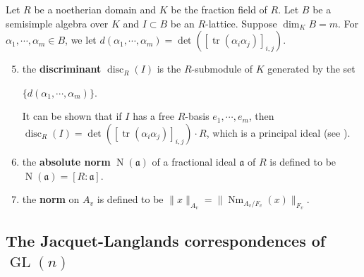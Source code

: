 \documentclass[11pt]{article}
\theoremstyle{plain}
\theoremstyle{remark}
\theoremstyle{definition}
\DeclareMathOperator{\tr}{tr}
\DeclareMathOperator{\Nm}{Nm}
\DeclareMathOperator{\GL}{GL}
\DeclareMathOperator{\disc}{disc}
\DeclareMathOperator{\N}{N}
\begin{document}

Let $R$ be a noetherian domain and $K$ be the fraction field of $R$.
Let $B$ be a semisimple algebra over $K$ and $I
\subset B$ be an $R$-lattice. 
Suppose $\dim_K B=m$. 
For $\alpha_1,\cdots,\alpha_m\in B$, we let $d(\alpha_1,\cdots,\alpha_m)=\det([\tr(\alpha_i\alpha_j)]_{i,j})$.  

\begin{enumerate}
\setcounter{enumi}{4}
\item the \textbf{discriminant} $\disc_{R}(I)$ is the $R$-submodule of $K$ generated by the set
\begin{center}
    $\{d(\alpha_1,\cdots,\alpha_m)\}$. 
\end{center}
It can be shown that if $I$ has a free $R$-basis $e_1,\cdots,e_m$, then $\disc_R(I)=\det([\tr(\alpha_i\alpha_j)]_{i,j})\cdot R$, which is a principal ideal (see \cite[\S 10]{Rei03}). 

\item the \textbf{absolute norm} $\N(\mathfrak{a})$ of a fractional ideal $\mathfrak{a}$ of $R$ is defined to be $\N(\mathfrak{a})=[R\colon \mathfrak{a}]$.




\item the \textbf{norm} on $A_v$ is defined to be $\|x\|_{A_v}=\|\Nm_{A_v/F_v}(x)\|_{F_v}$. 
\end{enumerate}



\subsection{The Jacquet-Langlands correspondences of $\GL(n)$}
\end{document}
